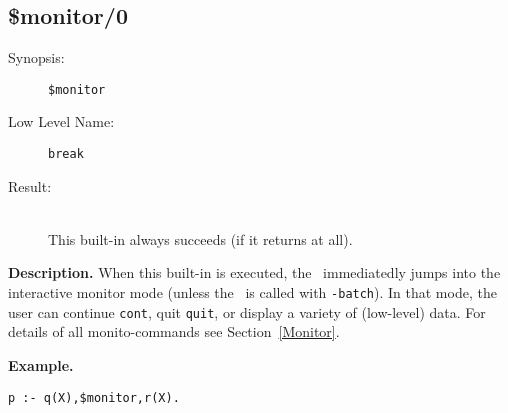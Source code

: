 %
%
%
\subsection{\$monitor/0}

\begin{description}
\item[Synopsis:]
	{\tt \$monitor}
\item[Low Level Name:]
	{\tt break }
\item[Result:]\ \\
This built-in always succeeds (if it returns at all).
\end{description}

\vspace*{0.5cm}
\noindent
{\bf Description.}
When this built-in is executed, the \SAM\ immediatedly jumps into the interactive monitor mode (unless the \SAM\ is called with {\tt -batch}). 
In that mode, the user can continue {\tt cont}, quit {\tt quit}, or display
a variety of (low-level) data. For details of all monito-commands see
Section~\ref{Monitor}.

\vspace*{0.5cm}
\noindent
{\bf Example.}
\begin{verbatim}
p :- q(X),$monitor,r(X).
\end{verbatim}


